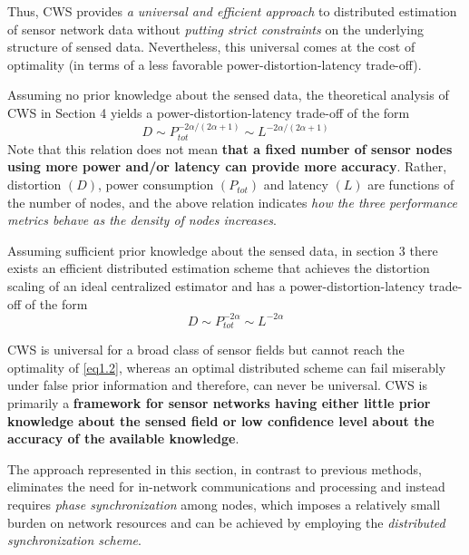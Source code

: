 Thus, CWS provides \emph{a universal and efficient approach} to distributed estimation of sensor network data without \emph{\textcolor[rgb]{1,0,0}{putting strict constraints}} on the underlying structure of sensed data. Nevertheless, this universal comes at the cost of optimality (in terms of a less favorable power-distortion-latency trade-off). 

Assuming no prior knowledge about the sensed data, the theoretical analysis of CWS in Section 4 yields a power-distortion-latency trade-off of the form
\begin{equation}
    D \sim P_{tot}^{-2 \alpha/(2\alpha + 1)} \sim L^{-2\alpha/(2\alpha + 1)}
    \label{eq1.1}
\end{equation}
Note that this relation does not mean \textbf{\textcolor[rgb]{0,0,1}{that a fixed number of sensor nodes using more power and/or latency can provide more accuracy}}. Rather, distortion $(D)$, power consumption $(P_{tot})$ and latency $(L)$ are functions of the number of nodes, and the above relation indicates \emph{\textcolor[rgb]{1,0,0}{how the three performance metrics behave as the density of nodes increases}}.

Assuming sufficient prior knowledge about the sensed data, in section 3 there exists an efficient distributed estimation scheme that achieves the distortion scaling of an ideal centralized estimator and has a power-distortion-latency trade-off of the form
\begin{equation}
    D \sim P_{tot}^{-2\alpha} \sim L^{-2\alpha}
    \label{eq1.2}
\end{equation}

CWS is universal for a broad class of sensor fields but cannot reach the optimality of \cref{eq1.2}, whereas an optimal distributed scheme can fail miserably under false prior information and therefore, can never be universal. CWS is primarily a \textbf{\textcolor[rgb]{1,0,0}{framework for sensor networks having either little prior knowledge about the sensed field or low confidence level about the accuracy of the available knowledge}}.

The approach represented in this section, in contrast to previous methods, eliminates the need for in-network communications and processing and instead requires \emph{\textcolor[rgb]{1,0,0}{phase synchronization}} among nodes, which imposes a relatively small burden on network resources and can be achieved by employing the \emph{\textcolor[rgb]{1,0,0}{distributed synchronization scheme}}. 

